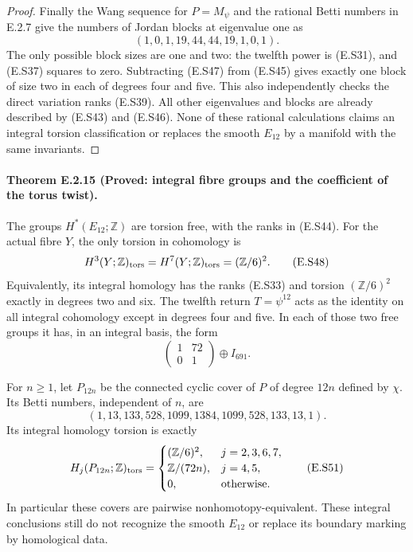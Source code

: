\begin{proof}
Finally the Wang sequence for $P=M_\psi$ and the rational
Betti numbers in E.2.7 give the numbers of Jordan blocks
at eigenvalue one as
\[
          (1,0,1,19,44,44,19,1,0,1).
 \tag{E.S47}
\]
The only possible block sizes are one and two: the
twelfth power is (E.S31), and (E.S37) squares to zero.
Subtracting (E.S47) from (E.S45) gives exactly one block
of size two in each of degrees four and five. This also
independently checks the direct variation ranks (E.S39).
All other eigenvalues and blocks are already described
by (E.S43) and (E.S46). None of these rational calculations
claims an integral torsion classification or replaces the
smooth $E_{12}$ by a manifold with the same invariants.
\end{proof}

\paragraph{Theorem E.2.15 (Proved: integral fibre groups and the coefficient of the torus twist).}
The groups $H^*(E_{12};\mathbb Z)$ are torsion free, with
the ranks in (E.S44). For the actual fibre $Y$, the only
torsion in cohomology is
\[
       H^3(Y;\mathbb Z)_{\rm tors}
       =H^7(Y;\mathbb Z)_{\rm tors}=(\mathbb Z/6)^2.
 \tag{E.S48}
\]
Equivalently, its integral homology has the ranks (E.S33)
and torsion $(\mathbb Z/6)^2$ exactly in degrees two and six.
The twelfth return $T=\psi^{12}$ acts as the identity on
all integral cohomology except in degrees four and five.
In each of those two free groups it has, in an integral
basis, the form
\[
             \begin{pmatrix}1&72\\0&1\end{pmatrix}
                                  \oplus I_{691}.
 \tag{E.S49}
\]

For $n\geq1$, let $P_{12n}$ be the connected cyclic cover
of $P$ of degree $12n$ defined by $\chi$. Its Betti numbers,
independent of $n$, are
\[
       (1,13,133,528,1099,1384,1099,528,133,13,1).
 \tag{E.S50}
\]
Its integral homology torsion is exactly
\[
 H_j(P_{12n};\mathbb Z)_{\rm tors}=
 \begin{cases}
       (\mathbb Z/6)^2,&j=2,3,6,7,\\
       \mathbb Z/(72n),&j=4,5,\\
       0,&\text{otherwise}.
 \end{cases}
 \tag{E.S51}
\]
In particular these covers are pairwise nonhomotopy-equivalent.
These integral conclusions still do not recognize the smooth
$E_{12}$ or replace its boundary marking by homological data.

